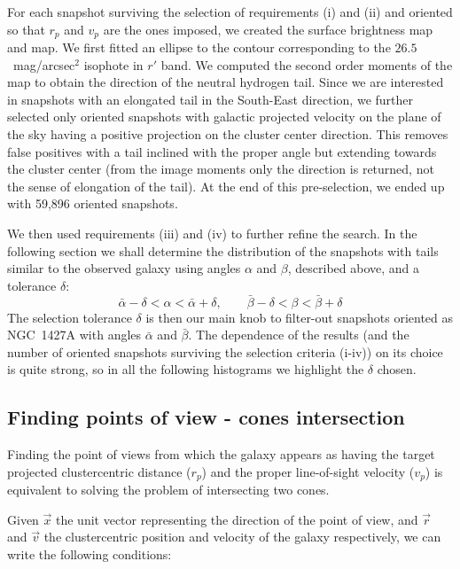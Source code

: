 For each snapshot surviving the selection of requirements (i) and (ii) and oriented so that $r_p$ and $v_p$ are the ones imposed, we created the surface brightness map and \Hi{} map.
We first fitted an ellipse to the contour corresponding to the $26.5$~mag/arcsec$^2$ isophote in $r'$ band.
We computed the second order moments of the \Hi{} map to obtain the direction of the neutral hydrogen tail.
Since we are interested in snapshots with an elongated \Hi{} tail in the South-East direction, we further selected only oriented snapshots with galactic projected velocity on the plane of the sky having a positive projection on the cluster center direction. This removes false positives with a \Hi{} tail inclined with the proper angle but extending towards the cluster center (from the image moments only the direction is returned, not the sense of elongation of the tail).
At the end of this pre-selection, we ended up with 59,896 oriented snapshots.

We then used requirements (iii) and (iv) to further refine the search.
In the following section we shall determine the distribution of the snapshots with tails similar to the observed galaxy using angles $\alpha$ and $\beta$, described above, and a tolerance $\delta$:
\begin{equation*}
\bar \alpha - \delta < \alpha < \bar \alpha + \delta, \qquad
\bar \beta - \delta < \beta < \bar \beta + \delta
\end{equation*}
The selection tolerance $\delta$ is then our main knob to filter-out snapshots oriented as NGC~1427A with angles $\bar \alpha$ and $\bar \beta$. The dependence of the results (and the number of oriented snapshots surviving the selection criteria (i-iv)) on its choice is quite strong, so in all the following histograms we highlight the $\delta$ chosen.


\subsection{Finding points of view - cones intersection}
\label{sec:cone_intersection}
Finding the point of views from which the galaxy appears as having the target projected clustercentric distance ($r_p$) and the proper line-of-sight velocity ($v_p$) is equivalent to solving the problem of intersecting two cones.

Given $\vec x$ the unit vector representing the direction of the point of view, and $\vec r$ and $\vec v$ the clustercentric position and velocity of the galaxy respectively, we can write the following conditions:

